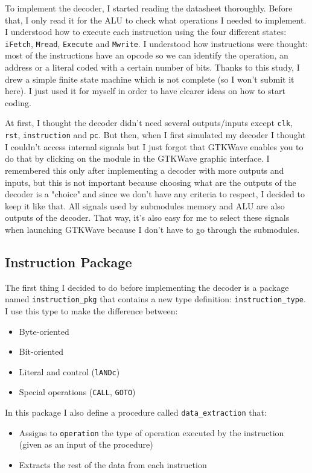 To implement the decoder, I started reading the datasheet thoroughly. Before that, I only read it for the ALU to check what operations I needed to implement. I understood how to execute each instruction using the four different states: \texttt{iFetch}, \texttt{Mread}, \texttt{Execute} and \texttt{Mwrite}. I understood how instructions were thought: most of the instructions have an opcode so we can identify the operation, an address or a literal coded with a certain number of bits. Thanks to this study, I drew a simple finite state machine which is not complete (so I won't submit it here). I just used it for myself in order to have clearer ideas on how to start coding.

At first, I thought the decoder didn't need several outputs/inputs except \texttt{clk}, \texttt{rst}, \texttt{instruction} and \texttt{pc}. But then, when I first simulated my decoder I thought I couldn't access internal signals but I just forgot that GTKWave enables you to do that by clicking on the module in the GTKWave graphic interface. I remembered this only after implementing a decoder with more outputs and inputs, but this is not important because choosing what are the outputs of the decoder is a "choice" and since we don't have any criteria to respect, I decided to keep it like that. All signals used by submodules memory and ALU are also outputs of the decoder. That way, it's also easy for me to select these signals when launching GTKWave because I don't have to go through the submodules.

\subsection{Instruction Package}
The first thing I decided to do before implementing the decoder is a package named \texttt{instruction\_pkg} that contains a new type definition: \texttt{instruction\_type}. I use this type to make the difference between:
\begin{itemize}
    \item Byte-oriented
    \item Bit-oriented
    \item Literal and control (\texttt{lANDc})
    \item Special operations (\texttt{CALL}, \texttt{GOTO})
\end{itemize}

In this package I also define a procedure called \texttt{data\_extraction} that:
\begin{itemize}
    \item Assigns to \texttt{operation} the type of operation executed by the instruction (given as an input of the procedure)
    \item Extracts the rest of the data from each instruction
\end{itemize}

